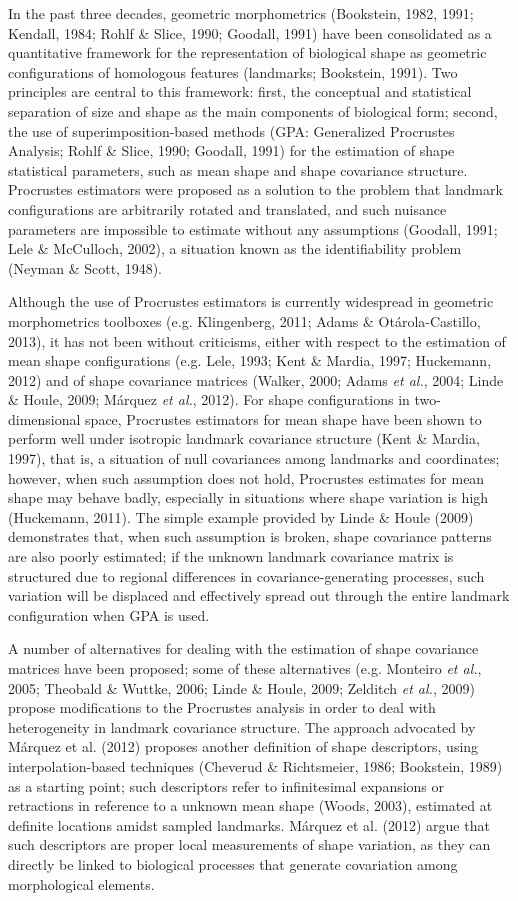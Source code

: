 \documentclass[12pt,]{article}
\begin{document}
In the past three decades, geometric morphometrics (Bookstein, 1982,
1991; Kendall, 1984; Rohlf \& Slice, 1990; Goodall, 1991) have been
consolidated as a quantitative framework for the representation of
biological shape as geometric configurations of homologous features
(landmarks; Bookstein, 1991). Two principles are central to this
framework: first, the conceptual and statistical separation of size and
shape as the main components of biological form; second, the use of
superimposition-based methods (GPA: Generalized Procrustes Analysis;
Rohlf \& Slice, 1990; Goodall, 1991) for the estimation of shape
statistical parameters, such as mean shape and shape covariance
structure. Procrustes estimators were proposed as a solution to the
problem that landmark configurations are arbitrarily rotated and
translated, and such nuisance parameters are impossible to estimate
without any assumptions (Goodall, 1991; Lele \& McCulloch, 2002), a
situation known as the identifiability problem (Neyman \& Scott, 1948).

Although the use of Procrustes estimators is currently widespread in
geometric morphometrics toolboxes (e.g. Klingenberg, 2011; Adams \&
Otárola-Castillo, 2013), it has not been without criticisms, either with
respect to the estimation of mean shape configurations (e.g. Lele, 1993;
Kent \& Mardia, 1997; Huckemann, 2012) and of shape covariance matrices
(Walker, 2000; Adams \emph{et al.}, 2004; Linde \& Houle, 2009; Márquez
\emph{et al.}, 2012). For shape configurations in two-dimensional space,
Procrustes estimators for mean shape have been shown to perform well
under isotropic landmark covariance structure (Kent \& Mardia, 1997),
that is, a situation of null covariances among landmarks and
coordinates; however, when such assumption does not hold, Procrustes
estimates for mean shape may behave badly, especially in situations
where shape variation is high (Huckemann, 2011). The simple example
provided by Linde \& Houle (2009) demonstrates that, when such
assumption is broken, shape covariance patterns are also poorly
estimated; if the unknown landmark covariance matrix is structured due
to regional differences in covariance-generating processes, such
variation will be displaced and effectively spread out through the
entire landmark configuration when GPA is used.

A number of alternatives for dealing with the estimation of shape
covariance matrices have been proposed; some of these alternatives (e.g.
Monteiro \emph{et al.}, 2005; Theobald \& Wuttke, 2006; Linde \& Houle,
2009; Zelditch \emph{et al.}, 2009) propose modifications to the
Procrustes analysis in order to deal with heterogeneity in landmark
covariance structure. The approach advocated by Márquez et al. (2012)
proposes another definition of shape descriptors, using
interpolation-based techniques (Cheverud \& Richtsmeier, 1986;
Bookstein, 1989) as a starting point; such descriptors refer to
infinitesimal expansions or retractions in reference to a unknown mean
shape (Woods, 2003), estimated at definite locations amidst sampled
landmarks. Márquez et al. (2012) argue that such descriptors are proper
local measurements of shape variation, as they can directly be linked to
biological processes that generate covariation among morphological
elements.
\end{document}
